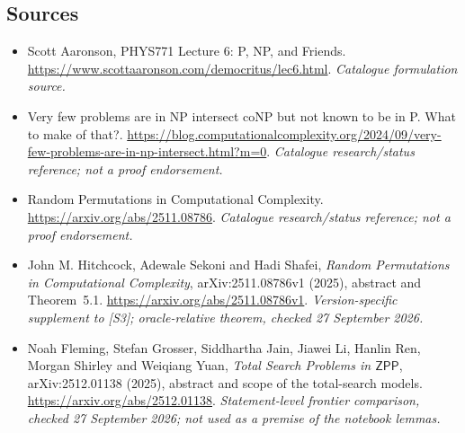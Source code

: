 \documentclass[11pt,a4paper]{article}
\numberwithin{equation}{section}
\begin{document}
\subsection{Sources}
\begin{itemize}\raggedright
\item[\textnormal{[S1]}]\hypertarget{source:30006687:1}{} Scott Aaronson, PHYS771 Lecture 6: P, NP, and Friends.
\url{https://www.scottaaronson.com/democritus/lec6.html}.
{\small\textit{Catalogue formulation source.}}
\item[\textnormal{[S2]}]\hypertarget{source:30006687:2}{} Very few problems are in NP intersect coNP but not known to be in P. What to make of that?.
\url{https://blog.computationalcomplexity.org/2024/09/very-few-problems-are-in-np-intersect.html?m=0}.
{\small\textit{Catalogue research/status reference; not a proof endorsement.}}
\item[\textnormal{[S3]}]\hypertarget{source:30006687:3}{} Random Permutations in Computational Complexity.
\url{https://arxiv.org/abs/2511.08786}.
{\small\textit{Catalogue research/status reference; not a proof endorsement.}}
\item[\textnormal{[E1]}]\hypertarget{extra:30006687:1}{} John M. Hitchcock,
Adewale Sekoni and Hadi Shafei, \emph{Random Permutations in Computational
Complexity}, arXiv:2511.08786v1 (2025), abstract and Theorem~5.1.
\url{https://arxiv.org/abs/2511.08786v1}.
{\small\textit{Version-specific supplement to [S3]; oracle-relative theorem,
checked 27 September 2026.}}
\item[\textnormal{[E2]}]\hypertarget{extra:30006687:2}{} Noah Fleming, Stefan
Grosser, Siddhartha Jain, Jiawei Li, Hanlin Ren, Morgan Shirley and
Weiqiang Yuan, \emph{Total Search Problems in $\mathsf{ZPP}$},
arXiv:2512.01138 (2025), abstract and scope of the total-search models.
\url{https://arxiv.org/abs/2512.01138}.
{\small\textit{Statement-level frontier comparison, checked
27 September 2026; not used as a premise of the notebook lemmas.}}

\end{itemize}

\end{document}
